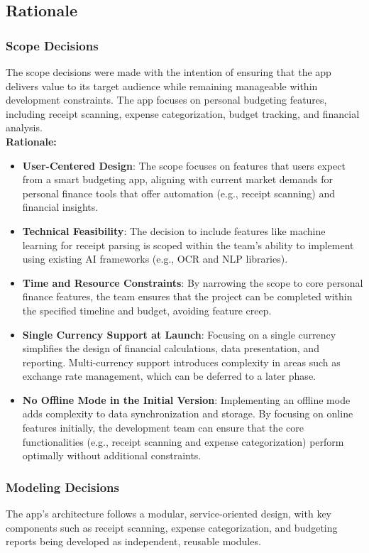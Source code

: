 \documentclass[12pt]{article}
\begin{document}
\subsection{Rationale}

\subsubsection{Scope Decisions}
The scope decisions were made with the intention of ensuring that the app delivers value to its target audience while remaining manageable within development constraints. The app focuses on personal budgeting features, including receipt scanning, expense categorization, budget tracking, and financial analysis. \\

\noindent\textbf{Rationale:}
\begin{itemize}
    \item \textbf{User-Centered Design}: The scope focuses on features that users expect from a smart budgeting app, aligning with current market demands for personal finance tools that offer automation (e.g., receipt scanning) and financial insights.
    \item \textbf{Technical Feasibility}: The decision to include features like machine learning for receipt parsing is scoped within the team’s ability to implement using existing AI frameworks (e.g., OCR and NLP libraries).
    \item \textbf{Time and Resource Constraints}: By narrowing the scope to core personal finance features, the team ensures that the project can be completed within the specified timeline and budget, avoiding feature creep.
    \item \textbf{Single Currency Support at Launch}: Focusing on a single currency simplifies the design of financial calculations, data presentation, and reporting. Multi-currency support introduces complexity in areas such as exchange rate management, which can be deferred to a later phase.
    \item \textbf{No Offline Mode in the Initial Version}: Implementing an offline mode adds complexity to data synchronization and storage. By focusing on online features initially, the development team can ensure that the core functionalities (e.g., receipt scanning and expense categorization) perform optimally without additional constraints.
\end{itemize}

\subsubsection{Modeling Decisions}
The app’s architecture follows a modular, service-oriented design, with key components such as receipt scanning, expense categorization, and budgeting reports being developed as independent, reusable modules.\\
\end{document}
